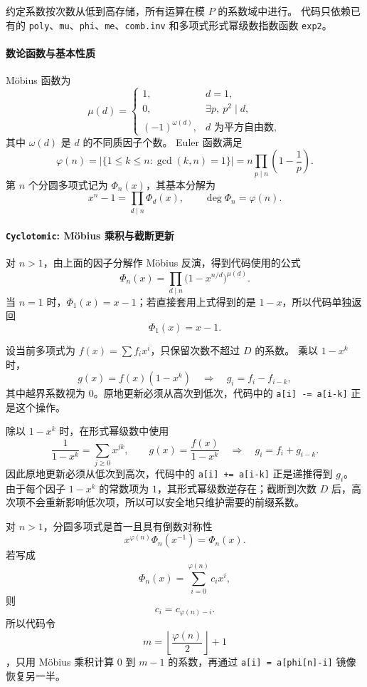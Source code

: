 约定系数按次数从低到高存储，所有运算在模 $P$ 的系数域中进行。
代码只依赖已有的 \texttt{poly}、\texttt{mu}、\texttt{phi}、\texttt{me}、\texttt{comb.inv} 和多项式形式幂级数指数函数 \texttt{exp2}。

\paragraph*{数论函数与基本性质}

Möbius 函数为
\[
\mu(d)=
\begin{cases}
1, & d=1,\\
0, & \exists p,\ p^2\mid d,\\
(-1)^{\omega(d)}, & d\text{ 为平方自由数},
\end{cases}
\]
其中 $\omega(d)$ 是 $d$ 的不同质因子个数。
Euler 函数满足
\[
\varphi(n)=\left|\{1\leq k\leq n:\gcd(k,n)=1\}\right|
=n\prod_{p\mid n}\left(1-\frac1p\right).
\]
第 $n$ 个分圆多项式记为 $\Phi_n(x)$，其基本分解为
\[
x^n-1=\prod_{d\mid n}\Phi_d(x),
\qquad \deg\Phi_n=\varphi(n).
\]

\paragraph*{\texttt{Cyclotomic}: Möbius 乘积与截断更新}

对 $n>1$，由上面的因子分解作 Möbius 反演，得到代码使用的公式
\[
\boxed{
\Phi_n(x)=\prod_{d\mid n}\bigl(1-x^{n/d}\bigr)^{\mu(d)}
}.
\]
当 $n=1$ 时，$\Phi_1(x)=x-1$；若直接套用上式得到的是 $1-x$，所以代码单独返回
\[
\Phi_1(x)=x-1.
\]

设当前多项式为 $f(x)=\sum f_i x^i$，只保留次数不超过 $D$ 的系数。
乘以 $1-x^k$ 时，
\[
g(x)=f(x)(1-x^k)
\quad\Longrightarrow\quad
g_i=f_i-f_{i-k},
\]
其中越界系数视为 $0$。原地更新必须从高次到低次，代码中的
\texttt{a[i] -= a[i-k]} 正是这个操作。

除以 $1-x^k$ 时，在形式幂级数中使用
\[
\frac1{1-x^k}=\sum_{j\geq 0}x^{jk},
\qquad
g(x)=\frac{f(x)}{1-x^k}
\quad\Longrightarrow\quad
g_i=f_i+g_{i-k}.
\]
因此原地更新必须从低次到高次，代码中的
\texttt{a[i] += a[i-k]} 正是递推得到 $g_i$。
由于每个因子 $1-x^k$ 的常数项为 $1$，其形式幂级数逆存在；截断到次数 $D$ 后，高次项不会重新影响低次项，所以可以安全地只维护需要的前缀系数。

对 $n>1$，分圆多项式是首一且具有倒数对称性
\[
\boxed{
x^{\varphi(n)}\Phi_n(x^{-1})=\Phi_n(x)
}.
\]
若写成
\[
\Phi_n(x)=\sum_{i=0}^{\varphi(n)}c_i x^i,
\]
则
\[
c_i=c_{\varphi(n)-i}.
\]
所以代码令
\[
m=\left\lfloor\frac{\varphi(n)}2\right\rfloor+1
\]
，只用 Möbius 乘积计算 $0$ 到 $m-1$ 的系数，再通过
\texttt{a[i] = a[phi[n]-i]} 镜像恢复另一半。

